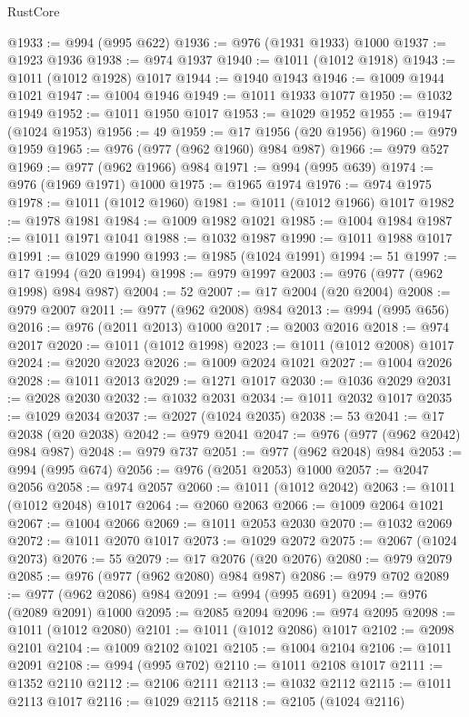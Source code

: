 \begin{lexlean}{RustCore}
\begin{coremodule}
@1933 := @994 (@995 @622)
@1936 := @976 (@1931 @1933) @1000
@1937 := @1923 @1936
@1938 := @974 @1937
@1940 := @1011 (@1012 @1918)
@1943 := @1011 (@1012 @1928) @1017
@1944 := @1940 @1943
@1946 := @1009 @1944 @1021
@1947 := @1004 @1946
@1949 := @1011 @1933 @1077
@1950 := @1032 @1949
@1952 := @1011 @1950 @1017
@1953 := @1029 @1952
@1955 := @1947 (@1024 @1953)
@1956 := 49
@1959 := @17 @1956 (@20 @1956)
@1960 := @979 @1959
@1965 := @976 (@977 (@962 @1960) @984 @987)
@1966 := @979 @527
@1969 := @977 (@962 @1966) @984
@1971 := @994 (@995 @639)
@1974 := @976 (@1969 @1971) @1000
@1975 := @1965 @1974
@1976 := @974 @1975
@1978 := @1011 (@1012 @1960)
@1981 := @1011 (@1012 @1966) @1017
@1982 := @1978 @1981
@1984 := @1009 @1982 @1021
@1985 := @1004 @1984
@1987 := @1011 @1971 @1041
@1988 := @1032 @1987
@1990 := @1011 @1988 @1017
@1991 := @1029 @1990
@1993 := @1985 (@1024 @1991)
@1994 := 51
@1997 := @17 @1994 (@20 @1994)
@1998 := @979 @1997
@2003 := @976 (@977 (@962 @1998) @984 @987)
@2004 := 52
@2007 := @17 @2004 (@20 @2004)
@2008 := @979 @2007
@2011 := @977 (@962 @2008) @984
@2013 := @994 (@995 @656)
@2016 := @976 (@2011 @2013) @1000
@2017 := @2003 @2016
@2018 := @974 @2017
@2020 := @1011 (@1012 @1998)
@2023 := @1011 (@1012 @2008) @1017
@2024 := @2020 @2023
@2026 := @1009 @2024 @1021
@2027 := @1004 @2026
@2028 := @1011 @2013
@2029 := @1271 @1017
@2030 := @1036 @2029
@2031 := @2028 @2030
@2032 := @1032 @2031
@2034 := @1011 @2032 @1017
@2035 := @1029 @2034
@2037 := @2027 (@1024 @2035)
@2038 := 53
@2041 := @17 @2038 (@20 @2038)
@2042 := @979 @2041
@2047 := @976 (@977 (@962 @2042) @984 @987)
@2048 := @979 @737
@2051 := @977 (@962 @2048) @984
@2053 := @994 (@995 @674)
@2056 := @976 (@2051 @2053) @1000
@2057 := @2047 @2056
@2058 := @974 @2057
@2060 := @1011 (@1012 @2042)
@2063 := @1011 (@1012 @2048) @1017
@2064 := @2060 @2063
@2066 := @1009 @2064 @1021
@2067 := @1004 @2066
@2069 := @1011 @2053 @2030
@2070 := @1032 @2069
@2072 := @1011 @2070 @1017
@2073 := @1029 @2072
@2075 := @2067 (@1024 @2073)
@2076 := 55
@2079 := @17 @2076 (@20 @2076)
@2080 := @979 @2079
@2085 := @976 (@977 (@962 @2080) @984 @987)
@2086 := @979 @702
@2089 := @977 (@962 @2086) @984
@2091 := @994 (@995 @691)
@2094 := @976 (@2089 @2091) @1000
@2095 := @2085 @2094
@2096 := @974 @2095
@2098 := @1011 (@1012 @2080)
@2101 := @1011 (@1012 @2086) @1017
@2102 := @2098 @2101
@2104 := @1009 @2102 @1021
@2105 := @1004 @2104
@2106 := @1011 @2091
@2108 := @994 (@995 @702)
@2110 := @1011 @2108 @1017
@2111 := @1352 @2110
@2112 := @2106 @2111
@2113 := @1032 @2112
@2115 := @1011 @2113 @1017
@2116 := @1029 @2115
@2118 := @2105 (@1024 @2116)

\end{coremodule}
\end{lexlean}
